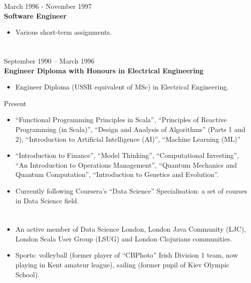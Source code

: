 \documentclass{res}
\begin{document}
\begin{resume}
 \hfill        March 1996 - November 1997\\
{\bf Software Engineer}
\begin{itemize} \itemsep -2pt %
 \item Various short-term assignments.
\end{itemize}

\section{}
\vspace{8pt}
 \hfill        September 1990 – March 1996\\
{\bf Engineer Diploma with Honours in Electrical Engineering}
\begin{itemize} \itemsep -2pt %
 \item Engineer Diploma (USSR equivalent of MSc) in Electrical Engineering.
\end{itemize}
 \hfill        Present
\begin{itemize} \itemsep -2pt %
 \item ``Functional Programming Principles in Scala'', ``Principles of Reactive Programming (in Scala)'', ``Design and Analysis of Algorithms'' (Parts 1 and 2), ``Introduction to Artificial Intelligence (AI)'', ``Machine Learning (ML)''
 \item ``Introduction to Finance'', ``Model Thinking'', ``Computational Investing'', ``An Introduction to Operations Management'', ``Quantum Mechanics and Quantum Computation'', ``Introduction to Genetics and Evolution''.
 \item Currently following Coursera’s ``Data Science'' Specialisation: a set of courses in Data Science field.
\end{itemize}

\vspace{8pt}
\section{}
\vspace{8pt}
\begin{itemize}
 \item An active member of Data Science London, London Java Community (LJC), London Scala User Group (LSUG) and London Clojurians communities.
 \item Sports: volleyball (former player of ``CBPhoto'' Irish Division 1 team, now playing in Kent amateur league), sailing (former pupil of Kiev Olympic School).
\end{itemize}


\end{resume}
\end{document}
